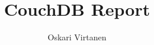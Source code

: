 \documentclass[12pt,a4paper,finnish,oneside]{article}
\begin{document}



\pagestyle{plain}

\author{Oskari Virtanen}

\title{CouchDB Report}

\DATE{\today}
\maketitle             %


\setcounter{page}{2}    %

\newpage                       %


\tableofcontents

\clearpage                     %

%








\newpage
{}  %



\end{document}
